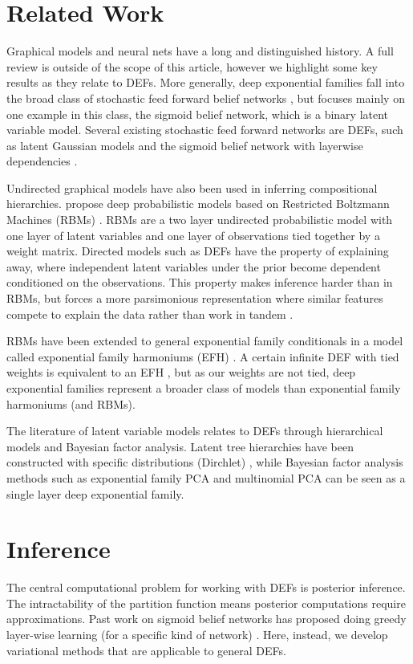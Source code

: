 \documentclass[twoside]{article}
\begin{document}
\section{Related Work}
Graphical models and neural nets have a long and
distinguished history. A full review is outside of the scope of this
article, however we highlight some key results as they relate to
DEFs. More generally, deep exponential families fall into the broad class of stochastic feed forward 
belief networks \citep{Neal:1990}, but \citet{Neal:1990} focuses mainly on one example in this class,
the sigmoid belief network, which is a binary latent variable model. Several existing stochastic feed 
forward networks are DEFs, such as latent Gaussian models \citep{Rezende:2014} and the sigmoid belief
network with layerwise dependencies \citep{Mnih:2014}. 

Undirected graphical models have also been used in inferring compositional
hierarchies. \citet{Salakhutdinov:2009b} propose
deep probabilistic models based on Restricted Boltzmann Machines (RBMs) \citep{Smolensky:1986}. 
RBMs are a two layer undirected probabilistic model with one layer of latent variables and one
layer of observations	 tied together by a weight matrix.
Directed models such as DEFs 
have the property of explaining away, where independent latent variables under the prior become
dependent conditioned on the observations. This property
makes inference harder than in RBMs, but forces a more parsimonious representation where
similar features compete to explain the data rather than work in tandem \citep{Goodfellow:2012, Bengio:2013}.

RBMs have been extended to
general exponential family conditionals in a model called exponential
family harmoniums (EFH) \citep{Welling:2004}. A certain infinite DEF with tied weights 
is equivalent to an EFH \citep{Hinton:2006}, but as our 
weights are not tied, deep exponential families
represent a broader class of models than exponential family harmoniums (and RBMs).

The literature of latent variable models relates to DEFs through hierarchical 
models and Bayesian factor analysis. Latent tree hierarchies have been
constructed with specific distributions (Dirchlet) \cite{Li:2006}, while
Bayesian factor analysis methods such as exponential family PCA \cite{Mohamed:2008} 
and multinomial PCA \citep{Buntine:2004} can be seen as a single layer deep exponential family.

\section{Inference}
The central computational problem for working with 
DEFs is posterior inference. The intractability 
of the partition function means posterior computations require
approximations. Past work on sigmoid belief networks has proposed doing greedy
layer-wise learning (for a specific kind of network) \cite{Hinton:2006}. 
Here, instead, we develop variational
methods \cite{Saul:1996} that are applicable to general DEFs.
\end{document}
